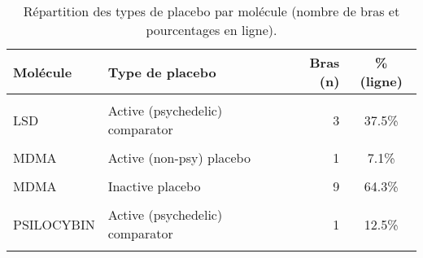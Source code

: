 \begin{table}[!h]
\centering
\caption{\label{tab:tab:repartition_placebos_par_molecule}Répartition des types de placebo par molécule (nombre de bras et pourcentages en ligne).}
\centering
\begin{tabular}[t]{llrc}
\toprule
Molécule & Type de placebo & Bras (n) & \% (ligne)\\
\midrule
\cellcolor{gray!10}{AYAHUASCA} & \cellcolor{gray!10}{Inactive placebo} & \cellcolor{gray!10}{2} & \cellcolor{gray!10}{100.0\%}\\
LSD & Active (psychedelic) comparator & 3 & 37.5\%\\
\cellcolor{gray!10}{LSD} & \cellcolor{gray!10}{Inactive placebo} & \cellcolor{gray!10}{5} & \cellcolor{gray!10}{62.5\%}\\
MDMA & Active (non-psy) placebo & 1 & 7.1\%\\
\cellcolor{gray!10}{MDMA} & \cellcolor{gray!10}{Active (psychedelic) comparator} & \cellcolor{gray!10}{4} & \cellcolor{gray!10}{28.6\%}\\
\addlinespace
MDMA & Inactive placebo & 9 & 64.3\%\\
\cellcolor{gray!10}{PSILOCYBIN} & \cellcolor{gray!10}{Active (non-psy) placebo} & \cellcolor{gray!10}{3} & \cellcolor{gray!10}{37.5\%}\\
PSILOCYBIN & Active (psychedelic) comparator & 1 & 12.5\%\\
\cellcolor{gray!10}{PSILOCYBIN} & \cellcolor{gray!10}{Inactive placebo} & \cellcolor{gray!10}{4} & \cellcolor{gray!10}{50.0\%}\\
\bottomrule
\end{tabular}
\end{table}
